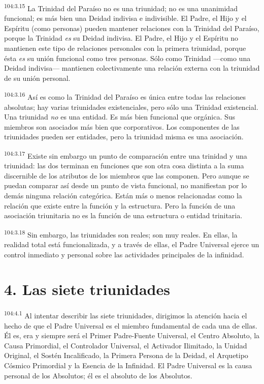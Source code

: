 \documentclass[twoside, 11pt]{book}
\begin{document}
\par
\textsuperscript{104:3.15} La Trinidad del Paraíso no es una triunidad; no es una unanimidad funcional; es más bien una Deidad indivisa e indivisible. El Padre, el Hijo y el Espíritu (como personas) pueden mantener relaciones con la Trinidad del Paraíso, porque la Trinidad \textit{es} su Deidad indivisa. El Padre, el Hijo y el Espíritu no mantienen este tipo de relaciones personales con la primera triunidad, porque ésta \textit{es} su unión funcional como tres personas. Sólo como Trinidad ---como una Deidad indivisa--- mantienen colectivamente una relación externa con la triunidad de su unión personal.

\par
\textsuperscript{104:3.16} Así es como la Trinidad del Paraíso es única entre todas las relaciones absolutas; hay varias triunidades existenciales, pero sólo una Trinidad existencial. Una triunidad \textit{no} es una entidad. Es más bien funcional que orgánica. Sus miembros son asociados más bien que corporativos. Los componentes de las triunidades pueden ser entidades, pero la triunidad misma es una asociación.

\par
\textsuperscript{104:3.17} Existe sin embargo un punto de comparación entre una trinidad y una triunidad: las dos terminan en funciones que son otra cosa distinta a la suma discernible de los atributos de los miembros que las componen. Pero aunque se puedan comparar así desde un punto de vista funcional, no manifiestan por lo demás ninguna relación categórica. Están más o menos relacionadas como la relación que existe entre la función y la estructura. Pero la función de una asociación triunitaria no es la función de una estructura o entidad trinitaria.

\par
\textsuperscript{104:3.18} Sin embargo, las triunidades son reales; son muy reales. En ellas, la realidad total está funcionalizada, y a través de ellas, el Padre Universal ejerce un control inmediato y personal sobre las actividades principales de la infinidad.

\section*{4. Las siete triunidades}
\par
\textsuperscript{104:4.1} Al intentar describir las siete triunidades, dirigimos la atención hacia el hecho de que el Padre Universal es el miembro fundamental de cada una de ellas. Él es, era y siempre será el Primer Padre-Fuente Universal, el Centro Absoluto, la Causa Primordial, el Controlador Universal, el Activador Ilimitado, la Unidad Original, el Sostén Incalificado, la Primera Persona de la Deidad, el Arquetipo Cósmico Primordial y la Esencia de la Infinidad. El Padre Universal es la causa personal de los Absolutos; él es el absoluto de los Absolutos.
\end{document}
